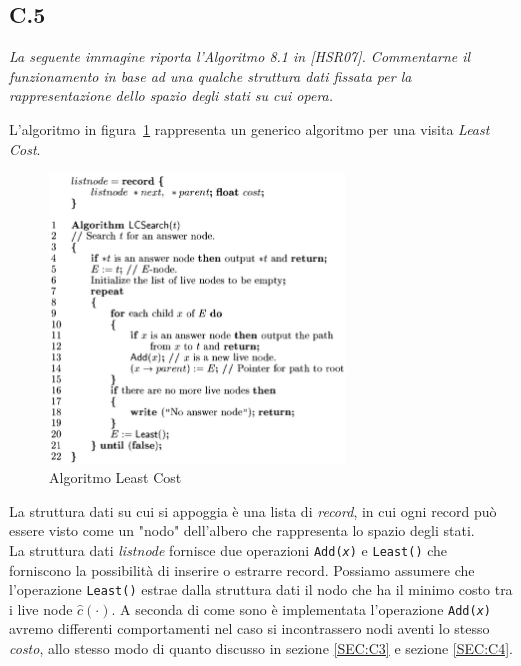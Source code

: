 \documentclass[a4paper]{article}
\begin{document}
\subsection{C.5}
\emph{La seguente immagine riporta l'Algoritmo 8.1 in [HSR07]. Commentarne il funzionamento in base ad una qualche struttura dati fissata per la rappresentazione dello spazio degli stati su cui opera.}


L'algoritmo in figura~\ref{FIG:C5} rappresenta un generico algoritmo per una visita \textit{Least Cost}.
\begin{figure}[!ht]
\centering
\includegraphics[width=0.7\textwidth]{./img/C5.png}
\caption{Algoritmo Least Cost} \label{FIG:C5}
\end{figure}
La struttura dati su cui si appoggia è una lista di \textit{record}, in cui ogni record può essere visto come un "nodo" dell'albero che rappresenta lo spazio degli stati.\\
La struttura dati \textit{listnode} fornisce due operazioni \texttt{Add(\textit{x})} e \texttt{Least()} che forniscono la possibilità di inserire o estrarre record.
Possiamo assumere che l'operazione \texttt{Least()} estrae dalla struttura dati il nodo che ha il minimo costo tra i live node $ \hat c(\cdot)$.
A seconda di come sono è implementata l'operazione \texttt{Add(\textit{x})} avremo differenti comportamenti nel caso si incontrassero nodi aventi lo stesso \textit{costo}, allo stesso modo di quanto discusso in sezione \ref{SEC:C3} e sezione \ref{SEC:C4}.
\end{document}
